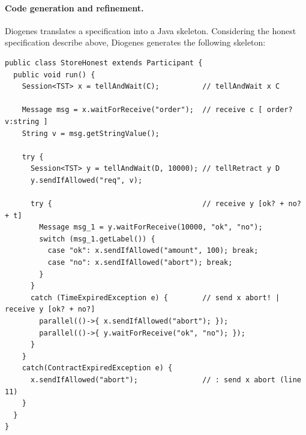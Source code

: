 \paragraph{Code generation and refinement.}
Diogenes translates a \coco specification
into a Java skeleton.
Considering the honest specification describe above,
Diogenes generates the following skeleton:
\begin{mdframed}
  \begin{verbatim}
public class StoreHonest extends Participant { 
  public void run() {
    Session<TST> x = tellAndWait(C);          // tellAndWait x C
    
    Message msg = x.waitForReceive("order");  // receive c [ order? v:string ]
    String v = msg.getStringValue();
    
    try {
      Session<TST> y = tellAndWait(D, 10000); // tellRetract y D
      y.sendIfAllowed("req", v);
      
      try {                                   // receive y [ok? + no? + t]
        Message msg_1 = y.waitForReceive(10000, "ok", "no");
        switch (msg_1.getLabel()) {                    
          case "ok": x.sendIfAllowed("amount", 100); break;
          case "no": x.sendIfAllowed("abort"); break;                    
        }
      }
      catch (TimeExpiredException e) {        // send x abort! | receive y [ok? + no?] 
        parallel(()->{ x.sendIfAllowed("abort"); });
        parallel(()->{ y.waitForReceive("ok", "no"); });
      }            
    }
    catch(ContractExpiredException e) {
      x.sendIfAllowed("abort");               // : send x abort (line 11)
    } 
  }
}
  \end{verbatim}
\end{mdframed}



